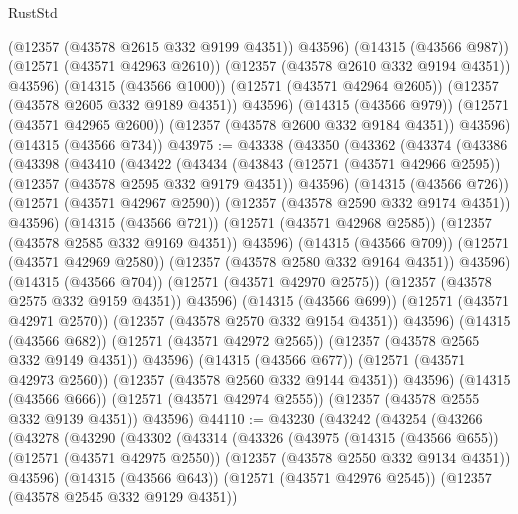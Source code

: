\begin{lexlean}{RustStd}
\begin{coremodule}
            (@12357 (@43578 @2615 @332 @9199 @4351))
            @43596)
          (@14315 (@43566 @987))
          (@12571 (@43571 @42963 @2610))
          (@12357 (@43578 @2610 @332 @9194 @4351))
          @43596)
        (@14315 (@43566 @1000))
        (@12571 (@43571 @42964 @2605))
        (@12357 (@43578 @2605 @332 @9189 @4351))
        @43596)
      (@14315 (@43566 @979))
      (@12571 (@43571 @42965 @2600))
      (@12357 (@43578 @2600 @332 @9184 @4351))
      @43596)
    (@14315 (@43566 @734))
@43975 := @43338
    (@43350
      (@43362
        (@43374
          (@43386
            (@43398
              (@43410
                (@43422
                  (@43434
                    (@43843
                      (@12571 (@43571 @42966 @2595))
                      (@12357 (@43578 @2595 @332 @9179 @4351))
                      @43596)
                    (@14315 (@43566 @726))
                    (@12571 (@43571 @42967 @2590))
                    (@12357 (@43578 @2590 @332 @9174 @4351))
                    @43596)
                  (@14315 (@43566 @721))
                  (@12571 (@43571 @42968 @2585))
                  (@12357 (@43578 @2585 @332 @9169 @4351))
                  @43596)
                (@14315 (@43566 @709))
                (@12571 (@43571 @42969 @2580))
                (@12357 (@43578 @2580 @332 @9164 @4351))
                @43596)
              (@14315 (@43566 @704))
              (@12571 (@43571 @42970 @2575))
              (@12357 (@43578 @2575 @332 @9159 @4351))
              @43596)
            (@14315 (@43566 @699))
            (@12571 (@43571 @42971 @2570))
            (@12357 (@43578 @2570 @332 @9154 @4351))
            @43596)
          (@14315 (@43566 @682))
          (@12571 (@43571 @42972 @2565))
          (@12357 (@43578 @2565 @332 @9149 @4351))
          @43596)
        (@14315 (@43566 @677))
        (@12571 (@43571 @42973 @2560))
        (@12357 (@43578 @2560 @332 @9144 @4351))
        @43596)
      (@14315 (@43566 @666))
      (@12571 (@43571 @42974 @2555))
      (@12357 (@43578 @2555 @332 @9139 @4351))
      @43596)
@44110 := @43230
    (@43242
      (@43254
        (@43266
          (@43278
            (@43290
              (@43302
                (@43314
                  (@43326
                    (@43975
                      (@14315 (@43566 @655))
                      (@12571 (@43571 @42975 @2550))
                      (@12357 (@43578 @2550 @332 @9134 @4351))
                      @43596)
                    (@14315 (@43566 @643))
                    (@12571 (@43571 @42976 @2545))
                    (@12357 (@43578 @2545 @332 @9129 @4351))

\end{coremodule}
\end{lexlean}
